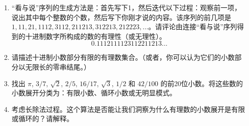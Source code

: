 \begin{enumerate}
  
  \vfill
  
  \textbookpagebreak
  
  \item “看与说”序列的生成方法是：首先写下1，然后迭代以下过程：观察前一项，说出其中每个整数的个数，然后写下你刚才说的内容。该序列的前几项是 $1, 11, 21, 1112, 3112, 211213, 312213, 212223, \ldots$。请评论由连接“看与说”序列得到的十进制数字所构成的数的有理性（或无理性）。
  \[ 0.1112111123112211213... \]
  
  \vfill
  
  \vfill
  
  \workbookpagebreak
  
  \item 
  
  请描述十进制小数部分有限的有理数集合。（或者，你可以认为它们的小数部分以无限长的零串结尾。）
  
  
  \vfill
  
  \item
  
  找出 $\pi$, $3/7$, $\sqrt{2}$, $2/5$, $16/17$, $\sqrt{3}$, $1/2$ 和 $42/100$ 的前20位小数。将这些数的小数展开分类为：有限小数、循环小数或无明显模式。
  
  
  \vfill
  
  \workbookpagebreak
   
  \item 
  
  考虑长除法过程。这个算法是否能让我们洞察为什么有理数的小数展开是有限或循环的？请解释。
  

\end{enumerate}
